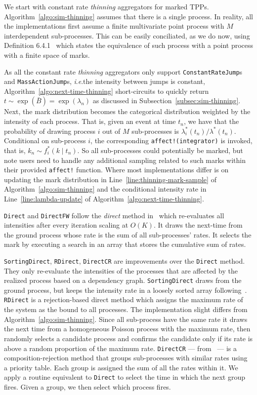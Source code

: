 \documentclass{juliacon}
\numberwithin{equation}{section}
\newcommand{\ie}{\textit{i}.\textit{e}.}
\begin{document}
We start with constant rate \textit{thinning} aggregators for marked TPPs. Algorithm~\ref{algo:sim-thinning} assumes that there is a single process. In reality, all the implementations first assume a finite multivariate point process with \( M \) interdependent sub-processes. This can be easily conciliated, as we do now, using Definition 6.4.1~\cite{daley2003} which states the equivalence of such process with a point process with a finite space of marks. 

As all the constant rate \textit{thinning} aggregators only support \texttt{ConstantRateJump}s and \texttt{MassActionJump}s, \ie the intensity between jumps is constant, Algorithm~\ref{algo:next-time-thinning} short-circuits to quickly return \( t \sim \exp(\bar{B}) = \exp(\lambda_n) \) as discussed in Subsection~\ref{subsec:sim-thinning}. Next, the mark distribution becomes the categorical distribution weighted by the intensity of each process. That is, given an event at time \( t_n \), we have that the probability of drawing process \( i \) out of \( M \) sub-processes is \( \lambda_i^\ast (t_n)  / \lambda^\ast (t_n) \). Conditional on sub-process \( i \), the corresponding \texttt{affect!(integrator)} is invoked, that is, \( k_n \sim f_i^\ast (k \mid t_n) \). So all sub-processes could potentially be marked, but note users need to handle any additional sampling related to such marks within their provided \texttt{affect!} function. Where most implementations differ is on updating the mark distribution in Line~\ref{line:thinning-mark-sample} of Algorithm~\ref{algo:sim-thinning} and the conditional intensity rate in Line~\ref{line:lambda-update} of Algorithm~\ref{algo:next-time-thinning}. 

\texttt{Direct} and \texttt{DirectFW} follow the \textit{direct} method in~\cite{gillespie1976} which re-evaluates all intensities after every iteration scaling at \( O(K) \). It draws the next-time from the ground process whose rate is the sum of all sub-processes' rates. It selects the mark by executing a search in an array that stores the cumulative sum of rates. 

\texttt{SortingDirect}, \texttt{RDirect}, \texttt{DirectCR} are improvements over the \texttt{Direct} method. They only re-evaluate the intensities of the processes that are affected by the realized process based on a dependency graph. \texttt{SortingDirect} draws from the ground process, but keeps the intensity rate in a loosely sorted array following~\cite{mccollum2006}. \texttt{RDirect} is a rejection-based direct method which assigns the maximum rate of the system as the bound to all processes. The implementation slight differs from Algorithm~\ref{algo:sim-thinning}. Since all sub-process have the same rate it draws the next time from a homogeneous Poisson process with the maximum rate, then randomly selects a candidate process and confirms the candidate only if its rate is above a random proportion of the maximum rate. \texttt{DirectCR} --- from~\cite{slepoy2008} --- is a composition-rejection method that groups sub-processes with similar rates using a priority table. Each group is assigned the sum of all the rates within it. We apply a routine equivalent to \texttt{Direct} to select the time in which the next group fires. Given a group, we then select which process fires.
\end{document}
